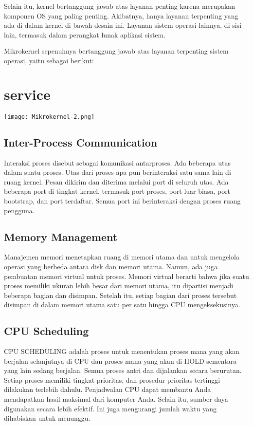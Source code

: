 \documentclass{article}
\begin{document}
	Selain itu, kernel bertanggung jawab atas layanan penting karena merupakan komponen OS yang paling penting. Akibatnya, hanya layanan terpenting yang ada di dalam kernel di bawah desain ini. Layanan sistem operasi lainnya, di sisi lain, termasuk dalam perangkat lunak aplikasi sistem.
	
	Mikrokernel sepenuhnya bertanggung jawab atas layanan terpenting sistem operasi, yaitu sebagai berikut:
	
	\section{service}
\texttt{[image: Mikrokernel-2.png]}

	
	\subsection*{Inter-Process Communication}
	
	Interaksi proses disebut sebagai komunikasi antarproses. Ada beberapa utas dalam suatu proses. Utas dari proses apa pun berinteraksi satu sama lain di ruang kernel. Pesan dikirim dan diterima melalui port di seluruh utas. Ada beberapa port di tingkat kernel, termasuk port proses, port luar biasa, port bootstrap, dan port terdaftar. Semua port ini berinteraksi dengan proses ruang pengguna.
	
	\subsection*{Memory Management}
	
	Manajemen memori menetapkan ruang di memori utama dan untuk mengelola operasi yang berbeda antara disk dan memori utama. Namun, ada juga pembuatan memori virtual untuk proses. Memori virtual berarti bahwa jika suatu proses memiliki ukuran lebih besar dari memori utama, itu dipartisi menjadi beberapa bagian dan disimpan. Setelah itu, setiap bagian dari proses tersebut disimpan di dalam memori utama satu per satu hingga CPU mengeksekusinya.
	
	\subsection*{CPU Scheduling}
	
	CPU SCHEDULING adalah proses untuk menentukan proses mana yang akan berjalan selanjutnya di CPU dan proses mana yang akan di-HOLD sementara yang lain sedang berjalan. Semua proses antri dan dijalankan secara berurutan. Setiap proses memiliki tingkat prioritas, dan prosedur prioritas tertinggi dilakukan terlebih dahulu. Penjadwalan CPU dapat membantu Anda mendapatkan hasil maksimal dari komputer Anda. Selain itu, sumber daya digunakan secara lebih efektif. Ini juga mengurangi jumlah waktu yang dihabiskan untuk menunggu.
	
\end{document}
